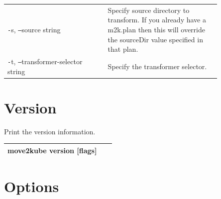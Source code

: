\documentclass[twocolumn]{article}
\newcommand{\lightlexendfont}[1]{{\lightlexendfontfamily #1}}
\newcommand{\tfontsize}{\fontsize{6}{12}\selectfont}
\newcommand{\dash}{\texttt{-}}
\newcommand{\doubledash}{\texttt{--}}
\begin{document}
{{{\begin{table}[H]
{\begin{tabular}{|>{\tfontsize}p{0.4\linewidth}|>{\tfontsize}p{0.45\linewidth}|}
{      Specify config key-value pairs.}                                                                                       \\ 
         \hline \dash s, \doubledash source string &
         \lightlexendfont{Specify source directory to transform. If you already have a
           m2k.plan then this will override the sourceDir value specified in that plan.}
      \\

      \hline \dash t, \doubledash transformer-selector string      & \lightlexendfont{Specify the
      transformer selector.}                                                                                                 \\
      \hline
    \end{tabular}
  } %
\end{table}

\clearpage %
\thispagestyle{secondpage}




\begin{table}[H]

  \section*{\hspace{0.5em}\normalsize Version}
  \vspace{-0.25cm}
  {\hspace{0.5em}\tfontsize Print the version information.}
  \vspace{0.25cm}

  \renewcommand{\arraystretch}{3} %
  {\scriptsize %
    \begin{tabular}{|p{0.895\linewidth}|}
      \arrayrulecolor{tableBorderColor} %

      \textbf{\small move2kube version [flags]} \\
      \hline
    \end{tabular}
  } %
\end{table}



\begin{table}[H]

  \section*{\hspace{0.5em}\normalsize Options}


\end{table}}}}
\end{document}
